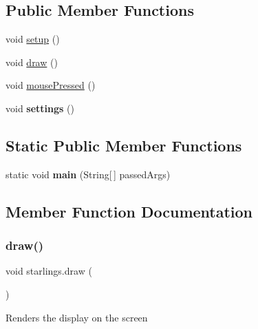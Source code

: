 \subsection*{Public Member Functions}
\begin{DoxyCompactItemize}
\item 
void \hyperlink{classstarlings_ae3237d3011a7d17127f7c5d3b7db4c8d}{setup} ()
\item 
void \hyperlink{classstarlings_ab9dc1bf7e725edf0e21387669aaa38bc}{draw} ()
\item 
void \hyperlink{classstarlings_a7482acd0c545833aacce135b5a8bd573}{mouse\+Pressed} ()
\item 
\mbox{\label{classstarlings_ab4389babbb4fcc756571ddb2a9f91cb9}} 
void {\bfseries settings} ()
\end{DoxyCompactItemize}
\subsection*{Static Public Member Functions}
\begin{DoxyCompactItemize}
\item 
\mbox{\label{classstarlings_aacba2310e0f458e0429fa02404d137dc}} 
static void {\bfseries main} (String\mbox{[}$\,$\mbox{]} passed\+Args)
\end{DoxyCompactItemize}


\subsection{Member Function Documentation}
\mbox{\label{classstarlings_ab9dc1bf7e725edf0e21387669aaa38bc}} 
\subsubsection{\texorpdfstring{draw()}{draw()}}
{\footnotesize\ttfamily void starlings.\+draw (\begin{DoxyParamCaption}{ }\end{DoxyParamCaption})\hspace{0.3cm}{\ttfamily [inline]}}

Renders the display on the screen\mbox{\label{classstarlings_a7482acd0c545833aacce135b5a8bd573}} 
